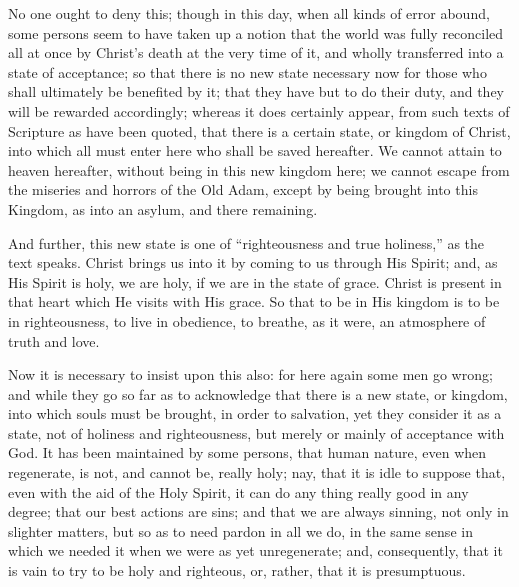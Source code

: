 No one ought to deny this; though in this day, when all kinds of
error abound, some persons seem to have taken up a notion that the
world was fully reconciled all at once by Christ's death at the very
time of it, and wholly transferred into a state of acceptance; so that
there is no new state necessary now for those who shall ultimately be
benefited by it; that they have but to do their duty, and they will be
rewarded accordingly; whereas it does certainly appear, from such
texts of Scripture as have been quoted, that there is a certain state,
or kingdom of Christ, into which all must enter here who shall be
saved hereafter. We cannot attain to heaven hereafter, without being
in this new kingdom here; we cannot escape from the miseries and
horrors of the Old Adam, except by being brought into this Kingdom, as
into an asylum, and there remaining.

And further, this new state is one of ``righteousness and true
holiness,'' as the text speaks. Christ brings us into it by coming
to us through His Spirit; and, as His Spirit is holy, we are holy, if
we are in the state of grace. Christ is present in that heart which He
visits with His grace. So that to be in His kingdom is to be in
righteousness, to live in obedience, to breathe, as it were, an
atmosphere of truth and love.

Now it is necessary to insist upon this also: for here again some
men go wrong; and while they go so far as to acknowledge that there is
a new state, or kingdom, into which souls must be brought, in order to
salvation, yet they consider it as a state, not of holiness and
righteousness, but merely or mainly of acceptance with God. It has
been maintained by some persons, that human nature, even when
regenerate, is not, and cannot be, really holy; nay, that it is idle
to suppose that, even with the aid of the Holy Spirit, it can do any
thing really good in any degree; that our best actions are sins; and
that we are always sinning, not only in slighter matters, but so as to
need pardon in all we do, in the same sense in which we needed it when
we were as yet unregenerate; and, consequently, that it is vain to try
to be holy and righteous, or, rather, that it is presumptuous.

